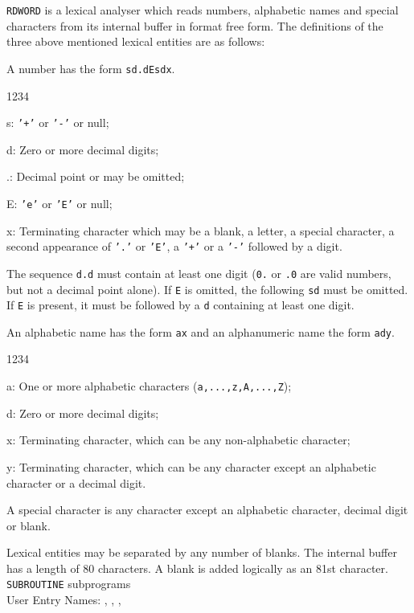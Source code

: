                     
             
\Submitter{}                
{\tt RDWORD} is a lexical analyser which reads numbers, alphabetic names
and special characters from its internal buffer in format free form.
The definitions of the three above mentioned lexical entities are as
follows:
\par
A number has the form {\tt sd.dEsdx}.
\begin{DLtt}{1234}
\item[s:] {\tt '+'} or {\tt '-'} or null;
\item[d:] Zero or more decimal digits;
\item[.:] Decimal point or may be omitted;
\item[E:] {\tt 'e'} or {\tt 'E'} or null;
\item[x:] Terminating character which may be a blank, a letter,
a special character, a second appearance of {\tt '.'} or {\tt 'E'},
a {\tt '+'} or a {\tt '-'} followed by a digit.
\end{DLtt}
The sequence {\tt d.d} must contain at least one digit ({\tt 0.} or
{\tt .0} are valid numbers, but not a decimal point alone).
If {\tt E} is omitted, the following {\tt sd} must be omitted.
If {\tt E} is  present, it must be followed by a {\tt d}
containing at least one digit.
\par
An alphabetic name has the form {\tt ax} and an alphanumeric name the
form {\tt ady}.
\begin{DLtt}{1234}
\item[a:] One or more alphabetic characters ({\tt a,...,z,A,...,Z});
\item[d:] Zero or more decimal digits;
\item[x:] Terminating character, which can be any non-alphabetic
character;
\item[y:] Terminating character, which can be any character except
an alphabetic character or a decimal digit.
\end{DLtt}
A special character is any character except an alphabetic character,
decimal digit or blank.
\par
Lexical entities may be separated by any number of blanks. The internal
buffer has a length of 80 characters. A blank is added logically as an
81st character.
\Structure
{\tt SUBROUTINE} subprograms\\
User Entry Names:
, , ,  \\

